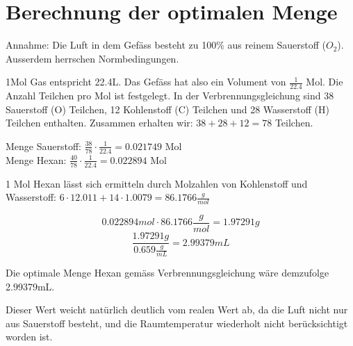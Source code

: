\documentclass[11pt,paper=a4,final]{scrartcl}
\begin{document}
\section{Berechnung der optimalen Menge}
Annahme: Die Luft in dem Gef\"ass besteht zu 100\% aus reinem Sauerstoff
(\(O_2\)). Ausserdem herrschen Normbedingungen.

1Mol Gas entspricht 22.4L. Das Gef\"ass hat also ein Volument von
\(\frac{1}{22.4}\) Mol. Die Anzahl Teilchen pro Mol ist festgelegt. In der
Verbrennungsgleichung sind 38 Sauerstoff (O) Teilchen, 12 Kohlenstoff (C)
Teilchen und 28 Wasserstoff (H) Teilchen enthalten.
Zusammen erhalten wir: \( 38 + 28 + 12 = 78 \) Teilchen.

Menge Sauerstoff: \( \frac{38}{78} \cdot \frac{1}{22.4} = 0.021749\) Mol \\
Menge Hexan:	  \( \frac{40}{78} \cdot \frac{1}{22.4} = 0.022894\) Mol

1 Mol Hexan l\"asst sich ermitteln durch Molzahlen von Kohlenstoff und
Wasserstoff: \(6 \cdot 12.011 + 14 \cdot 1.0079 = 86.1766 \frac{g}{mol} \)

\[ 0.022894 mol \cdot 86.1766\frac{g}{mol} = 1.97291g \]
\[ \frac{1.97291g}{0.659\frac{g}{mL}} = 2.99379mL \]

Die optimale Menge Hexan gem\"ass Verbrennungsgleichung w\"are demzufolge
2.99379mL.

Dieser Wert weicht nat\"urlich deutlich vom realen Wert ab, da die Luft nicht
nur aus Sauerstoff besteht, und die Raumtemperatur wiederholt nicht
ber\"ucksichtigt worden ist.

\newpage
\listoftables
\listoffigures
{}

\end{document}
